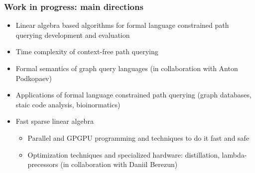 \documentclass[xcolor=table]{beamer}
\begin{document}
\begin{frame}[fragile]

  \frametitle{Work in progress: main directions}
\begin{itemize}
      \item Linear algebra based algorithms for formal language constrained path querying development and evaluation
      \item Time complexity of context-free path querying
      \item Formal semantics of graph query languages (in collaboration with Anton Podkopaev) 
      \item Applications of formal language constrained path querying (graph databases, staic code analysis, bioinormatics)
      \item Fast sparse linear algebra
      \begin{itemize}
        \item Parallel and GPGPU programming and techniques to do it fast and safe
        \item Optimization techniques and specialized hardware: distillation, lambda-precessors (in collaboration with Daniil Berezun)
      \end{itemize}
\end{itemize}
\end{frame}
\end{document}
